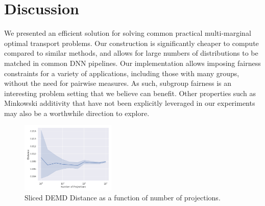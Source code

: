 \section{Discussion}
We presented an efficient solution for solving common practical multi-marginal optimal transport problems.
Our construction is significantly cheaper to compute compared to similar methods,
and allows for large numbers of distributions to be matched in common DNN pipelines. 
Our implementation allows imposing fairness constraints for a variety of applications, including those with many groups, without the need for pairwise measures.
As such, subgroup fairness \citep{kearns2018preventing} is an interesting problem setting that we believe can benefit.
Other properties such as 
Minkowski additivity that have not been 
explicitly leveraged in our experiments may also be a worthwhile direction to explore.
\begin{figure}
    \centering
    \includegraphics[width=0.4\textwidth]{6_demd/figs/sliced/demd_multidim_proj_convergence_CelebA.png}
    \caption{Sliced DEMD Distance as a function of number of projections.}
    \label{fig:sliced}
\end{figure}


